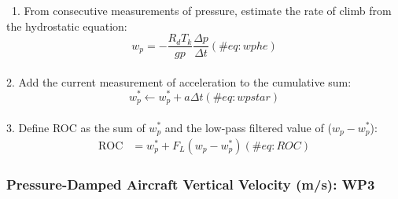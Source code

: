 \documentclass[
  english,
]{book}
\begin{document}
~1. From consecutive measurements of pressure, estimate the rate of
climb from the hydrostatic equation:\\
\begin{equation}
w_{p}=-\frac{R_{d}T_{k}}{gp}\frac{\Delta p}{\Delta t}
(\#eq:wphe)  
\end{equation}\\
\hspace*{0.333em}2. Add the current measurement of acceleration to the
cumulative sum: \begin{equation}
w_{p}^{*}\leftarrow w_{p}^{*}+a\Delta t
(\#eq:wpstar)
\end{equation}\\
\hspace*{0.333em}3. Define ROC as the sum of \(w_{p}^{*}\) and the
low-pass filtered value of (\(w_{p}-w_{p}^{*}\)):\\
\begin{align}
\mathrm{ROC} & =w_{p}^{*}+F_{L}(w_{p}-w_{p}^{*})
(\#eq:ROC)  
\end{align}

\hypertarget{wp3}{%
\subsubsection*{Pressure-Damped Aircraft Vertical Velocity (m/s):
WP3}\label{wp3}}
\end{document}
